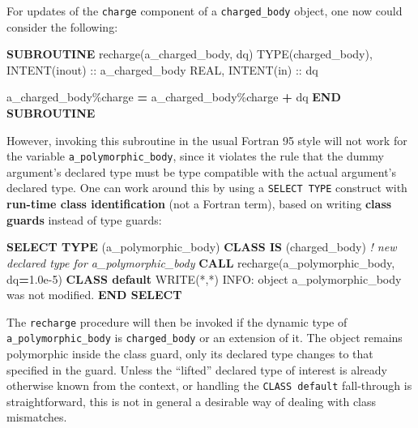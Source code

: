 \documentclass[
]{article}
\newenvironment{Shaded}{}{}
\newcommand{\CommentTok}[1]{\textcolor[rgb]{0.38,0.63,0.69}{\textit{#1}}}
\newcommand{\DataTypeTok}[1]{\textcolor[rgb]{0.56,0.13,0.00}{#1}}
\newcommand{\FloatTok}[1]{\textcolor[rgb]{0.25,0.63,0.44}{#1}}
\newcommand{\FunctionTok}[1]{\textcolor[rgb]{0.02,0.16,0.49}{#1}}
\newcommand{\KeywordTok}[1]{\textcolor[rgb]{0.00,0.44,0.13}{\textbf{#1}}}
\newcommand{\NormalTok}[1]{#1}
\newcommand{\OperatorTok}[1]{\textcolor[rgb]{0.40,0.40,0.40}{#1}}
\newcommand{\StringTok}[1]{\textcolor[rgb]{0.25,0.44,0.63}{#1}}
\begin{document}
For updates of the \texttt{charge} component of a \texttt{charged\_body}
object, one now could consider the following:

\begin{Shaded}
\begin{Highlighting}[]
\KeywordTok{SUBROUTINE}\NormalTok{ recharge(a\_charged\_body, dq)}
   \DataTypeTok{TYPE(charged\_body)}\NormalTok{, }\DataTypeTok{INTENT(inout)} \DataTypeTok{::}\NormalTok{ a\_charged\_body}
   \DataTypeTok{REAL}\NormalTok{, }\DataTypeTok{INTENT(in)} \DataTypeTok{::}\NormalTok{ dq}

\NormalTok{   a\_charged\_body}\OperatorTok{\%}\NormalTok{charge }\KeywordTok{=}\NormalTok{ a\_charged\_body}\OperatorTok{\%}\NormalTok{charge }\KeywordTok{+}\NormalTok{ dq}
\KeywordTok{END SUBROUTINE}
\end{Highlighting}
\end{Shaded}

However, invoking this subroutine in the usual Fortran 95 style will not
work for the variable \texttt{a\_polymorphic\_body}, since it violates
the rule that the dummy argument's declared type must be type compatible
with the actual argument's declared type. One can work around this by
using a \texttt{SELECT\ TYPE} construct with \textbf{run-time class
identification} (not a Fortran term), based on writing \textbf{class
guards} instead of type guards:

\begin{Shaded}
\begin{Highlighting}[]
\KeywordTok{SELECT TYPE}\NormalTok{ (a\_polymorphic\_body)}
\KeywordTok{CLASS IS}\NormalTok{ (charged\_body)  }\CommentTok{! new declared type for a\_polymorphic\_body}
   \KeywordTok{CALL}\NormalTok{ recharge(a\_polymorphic\_body, dq}\KeywordTok{=}\FloatTok{1.0e{-}5}\NormalTok{)}
\KeywordTok{CLASS default}
   \FunctionTok{WRITE(*}\NormalTok{,}\FunctionTok{*)} \StringTok{\textquotesingle{}INFO: object a\_polymorphic\_body was not modified.\textquotesingle{}}
\KeywordTok{END SELECT}
\end{Highlighting}
\end{Shaded}

The \texttt{recharge} procedure will then be invoked if the dynamic type
of \texttt{a\_polymorphic\_body} is \texttt{charged\_body} or an
extension of it. The object remains polymorphic inside the class guard,
only its declared type changes to that specified in the guard. Unless
the ``lifted'' declared type of interest is already otherwise known from
the context, or handling the \texttt{CLASS\ default} fall-through is
straightforward, this is not in general a desirable way of dealing with
class mismatches.
\end{document}
